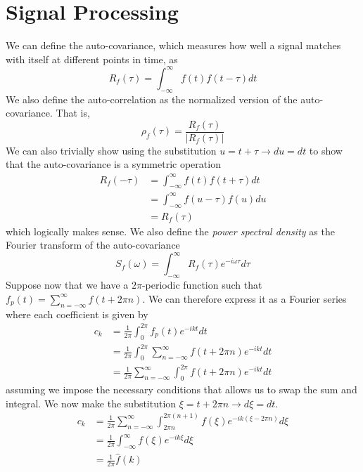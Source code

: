 \documentclass{report}
\theoremstyle{definition}
\theoremstyle{remark}
\begin{document}
\section{Signal Processing}
We can define the auto-covariance, which measures how well a signal matches with itself at different points in time, as 
\begin{equation*}
    R_f(\tau)=\int^\infty_{-\infty}f(t)f(t-\tau)dt
\end{equation*}
We also define the auto-correlation as the normalized version of the auto-covariance. That is, 
\begin{equation*}
    \rho_f(\tau) =\frac{R_f(\tau)}{|R_f(\tau)|}
\end{equation*}
We can also trivially show using the substitution $u=t+\tau \rightarrow du=dt$ to show that the auto-covariance is a symmetric operation 
\begin{equation*}
    \begin{split}
        R_f(-\tau) &= \int^\infty_{-\infty}f(t)f(t+\tau)dt \\
        &=\int^\infty_{-\infty}f(u-\tau)f(u)du \\
        &=R_f(\tau)
    \end{split}
\end{equation*}
which logically makes sense. We also define the \textit{power spectral density} as the Fourier transform of the auto-covariance 
\begin{equation*}
    S_f(\omega) =\int^\infty_{-\infty}R_f(\tau)e^{-i\omega \tau}d\tau
\end{equation*}
Suppose now that we have a $2\pi$-periodic function such that $f_p(t)=\sum^\infty_{n=-\infty}f(t+2\pi n)$. We can therefore express it as a Fourier series where each coefficient is given by 
\begin{equation*}
    \begin{split}
        c_k &= \frac{1}{2\pi}\int^{2\pi}_{0}f_p(t)e^{-ikt}dt \\
        &=\frac{1}{2\pi}\int^{2\pi}_0\sum^\infty_{n=-\infty}f(t+2\pi n)e^{-ikt}dt \\
        &= \frac{1}{2\pi}\sum^\infty_{n=-\infty} \int^{2\pi}_0f(t+2\pi n)e^{-ikt}dt
    \end{split}
\end{equation*}
assuming we impose the necessary conditions that allows us to swap the sum and integral. We now make the substitution $\xi=t+2\pi n \rightarrow d\xi = dt$.
\begin{equation*}
    \begin{split}
        c_k &= \frac{1}{2\pi}\sum^\infty_{n=-\infty} \int^{2\pi (n+1)}_{2\pi n} f(\xi)e^{-ik(\xi-2\pi n)}d\xi \\
        &=\frac{1}{2\pi}\int^\infty_{-\infty}f(\xi)e^{-ik\xi}d\xi \\
        &=\frac{1}{2\pi}\hat{f}(k)
    \end{split}
\end{equation*}
\end{document}
